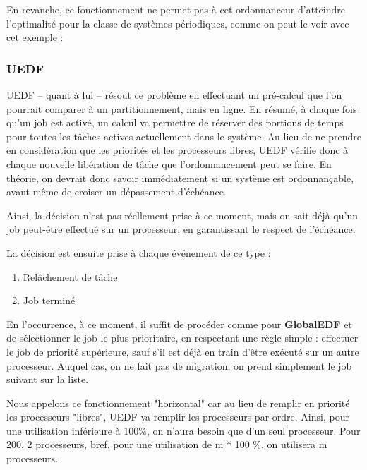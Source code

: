 		En revanche, ce fonctionnement ne permet pas à cet ordonnanceur d'atteindre 
		l'optimalité pour la classe de systèmes périodiques, comme on peut le voir 
		avec cet exemple :

		\subsubsection{UEDF}
		UEDF -- quant à lui -- résout ce problème en effectuant un pré-calcul 
		que l'on pourrait comparer à un partitionnement, mais en ligne.
		En résumé, à chaque fois qu'un job est activé, un calcul va permettre 
		de réserver des portions de temps pour toutes les tâches actives 
		actuellement dans le système. Au lieu de ne prendre en considération que 
		les priorités et les processeurs libres, UEDF vérifie donc à 
		chaque nouvelle libération de tâche que l'ordonnancement peut se faire. 
		En théorie, on devrait donc savoir immédiatement si un système est ordonnançable, avant même de croiser un dépassement d'échéance. 
		
		
		Ainsi, la décision n'est pas réellement prise à ce moment, 
		mais on sait déjà qu'un job peut-être effectué sur un 
		processeur, en garantissant le respect de l'échéance.
		
		La décision est ensuite prise à chaque événement de ce type :
		\begin{enumerate}
			\item Relâchement de tâche
			\item Job terminé
		\end{enumerate}

		En l'occurrence, à ce moment, il suffit de procéder comme pour \textbf{GlobalEDF} et de sélectionner le job le plus prioritaire, en respectant 
		une règle simple : effectuer le job de priorité supérieure, sauf s'il 
		est déjà en train d'être exécuté sur un autre processeur. Auquel cas, on ne 
		fait pas de migration, on prend simplement le job suivant sur la liste.
		
		
		Nous appelons ce fonctionnement "horizontal" car au lieu de remplir 
		en priorité les processeurs "libres", UEDF va remplir les 
		processeurs par ordre. Ainsi, pour une utilisation inférieure à 100\%, 
		on n'aura besoin que d'un seul processeur. Pour 200, 2 processeurs, bref, 
		pour une utilisation de m * 100 \%, on utilisera m processeurs.
		
